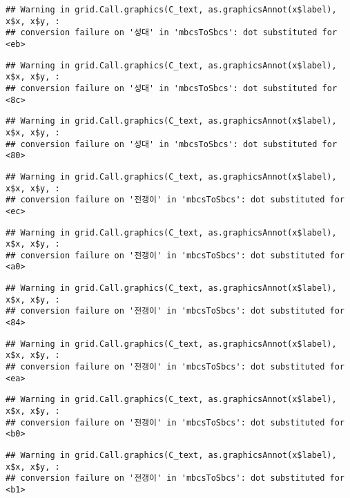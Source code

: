 \documentclass[
]{article}
\begin{document}
\begin{verbatim}
## Warning in grid.Call.graphics(C_text, as.graphicsAnnot(x$label), x$x, x$y, :
## conversion failure on '성대' in 'mbcsToSbcs': dot substituted for <eb>
\end{verbatim}

\begin{verbatim}
## Warning in grid.Call.graphics(C_text, as.graphicsAnnot(x$label), x$x, x$y, :
## conversion failure on '성대' in 'mbcsToSbcs': dot substituted for <8c>
\end{verbatim}

\begin{verbatim}
## Warning in grid.Call.graphics(C_text, as.graphicsAnnot(x$label), x$x, x$y, :
## conversion failure on '성대' in 'mbcsToSbcs': dot substituted for <80>
\end{verbatim}

\begin{verbatim}
## Warning in grid.Call.graphics(C_text, as.graphicsAnnot(x$label), x$x, x$y, :
## conversion failure on '전갱이' in 'mbcsToSbcs': dot substituted for <ec>
\end{verbatim}

\begin{verbatim}
## Warning in grid.Call.graphics(C_text, as.graphicsAnnot(x$label), x$x, x$y, :
## conversion failure on '전갱이' in 'mbcsToSbcs': dot substituted for <a0>
\end{verbatim}

\begin{verbatim}
## Warning in grid.Call.graphics(C_text, as.graphicsAnnot(x$label), x$x, x$y, :
## conversion failure on '전갱이' in 'mbcsToSbcs': dot substituted for <84>
\end{verbatim}

\begin{verbatim}
## Warning in grid.Call.graphics(C_text, as.graphicsAnnot(x$label), x$x, x$y, :
## conversion failure on '전갱이' in 'mbcsToSbcs': dot substituted for <ea>
\end{verbatim}

\begin{verbatim}
## Warning in grid.Call.graphics(C_text, as.graphicsAnnot(x$label), x$x, x$y, :
## conversion failure on '전갱이' in 'mbcsToSbcs': dot substituted for <b0>
\end{verbatim}

\begin{verbatim}
## Warning in grid.Call.graphics(C_text, as.graphicsAnnot(x$label), x$x, x$y, :
## conversion failure on '전갱이' in 'mbcsToSbcs': dot substituted for <b1>
\end{verbatim}
\end{document}
